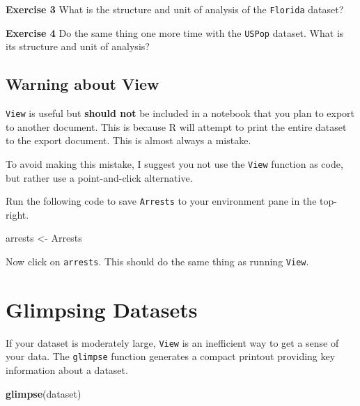\documentclass[
]{book}
\newenvironment{Shaded}{\begin{snugshade}}{\end{snugshade}}
\newcommand{\KeywordTok}[1]{\textcolor[rgb]{0.13,0.29,0.53}{\textbf{#1}}}
\newcommand{\NormalTok}[1]{#1}
\newcommand{\StringTok}[1]{\textcolor[rgb]{0.31,0.60,0.02}{#1}}
\newenvironment{learncheck}%
{%
  \par\vspace{\baselineskip}\noindent 
  \color{Exercise}\begin{itshape}%
  \par\vspace{\baselineskip}\noindent\ignorespaces 
}%
{%
  \end{itshape}\ignorespacesafterend 
}
\begin{document}
\begin{learncheck}
\textbf{Exercise 3} What is the structure and unit of analysis of the
\texttt{Florida} dataset?
\end{learncheck}

\begin{learncheck}
\textbf{Exercise 4} Do the same thing one more time with the
\texttt{USPop} dataset. What is its structure and unit of analysis?
\end{learncheck}

\hypertarget{warning-about-view}{%
\subsection{Warning about View}\label{warning-about-view}}

\texttt{View} is useful but \textbf{should not} be included in a notebook that you plan to export to another document. This is because R will attempt to print the entire dataset to the export document. This is almost always a mistake.

To avoid making this mistake, I suggest you not use the \texttt{View} function as code, but rather use a point-and-click alternative.

Run the following code to save \texttt{Arrests} to your environment pane in the top-right.

\begin{Shaded}
\begin{Highlighting}[]
\NormalTok{arrests <-}\StringTok{ }\NormalTok{Arrests}
\end{Highlighting}
\end{Shaded}

Now click on \texttt{arrests}. This should do the same thing as running \texttt{View}.

\hypertarget{glimpsing-datasets}{%
\section{Glimpsing Datasets}\label{glimpsing-datasets}}

If your dataset is moderately large, \texttt{View} is an inefficient way to get a sense of your data. The \texttt{glimpse} function generates a compact printout providing key information about a dataset.

\begin{Shaded}
\begin{Highlighting}[]
\KeywordTok{glimpse}\NormalTok{(dataset)}
\end{Highlighting}
\end{Shaded}
\end{document}
